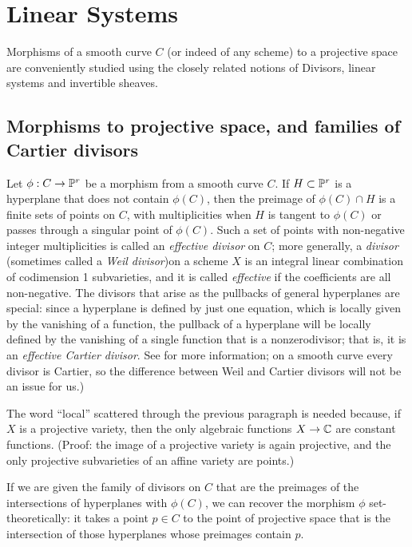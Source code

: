 

\chapter{Linear Systems}

Morphisms of a smooth curve $C$ (or indeed of any scheme) to a projective space are conveniently studied using the closely related notions of Divisors, linear systems and invertible sheaves. 

\section{Morphisms to projective space, and families of Cartier divisors}

Let $\phi: C\to {\mathbb P}^{r}$ be a morphism from a smooth curve $C$. If $H\subset {\mathbb P}^r$ is a hyperplane that does not contain $\phi(C)$, then the preimage of $\phi(C)\cap H$ is a finite sets of points on $C$, with multiplicities when $H$ is tangent to $\phi(C)$ or passes through a singular point of $\phi(C)$. Such a set of points with non-negative integer multiplicities is called an \emph{effective divisor} on $C$; more generally, a \emph{divisor} (sometimes called a \emph{Weil divisor})on a scheme $X$ is an integral linear combination of codimension 1 subvarieties, and it is called \emph{effective} if the coefficients are all non-negative. The divisors that arise as the pullbacks of general hyperplanes are special: since a hyperplane is defined by just one equation, which is locally given by the vanishing of a function, the pullback of a hyperplane will be locally defined by the vanishing of a single function that is a nonzerodivisor; that is, it is an  \emph{effective Cartier divisor}. See \cite[pp. 140-146]{H} for more information; on a smooth curve every divisor is Cartier, so the difference between Weil and Cartier divisors will not be an issue for us.) 

The  word ``local'' scattered through the previous paragraph is needed because, if $X$ is a projective variety, then the only algebraic functions $X\to {\mathbb C}$ are constant functions. (Proof: the image of a projective variety
is again projective, and the only projective subvarieties of an affine variety are points.)

If we are given the family of divisors on $C$ that are the preimages of the intersections of hyperplanes with  $\phi(C)$, we can recover the morphism $\phi$ set-theoretically: it takes a point $p\in C$ to the point of projective space that is the intersection of those
hyperplanes whose preimages contain $p$. 

